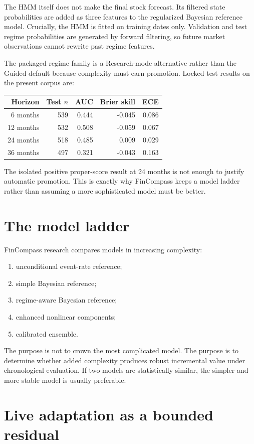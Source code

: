 \documentclass[11pt]{article}
\begin{document}
The HMM itself does not make the final stock forecast. Its filtered state probabilities are added as three features to the regularized Bayesian reference model. Crucially, the HMM is fitted on training dates only. Validation and test regime probabilities are generated by forward filtering, so future market observations cannot rewrite past regime features.

The packaged regime family is a Research-mode alternative rather than the Guided default because complexity must earn promotion. Locked-test results on the present corpus are:
\begin{center}
\begin{tabular}{rrrrr}\toprule
Horizon & Test $n$ & AUC & Brier skill & ECE\\\midrule
6 months & 539 & 0.444 & -0.045 & 0.086\\
12 months & 532 & 0.508 & -0.059 & 0.067\\
24 months & 518 & 0.485 & 0.009 & 0.029\\
36 months & 497 & 0.321 & -0.043 & 0.163\\
\bottomrule\end{tabular}
\end{center}
The isolated positive proper-score result at 24 months is not enough to justify automatic promotion. This is exactly why FinCompass keeps a model ladder rather than assuming a more sophisticated model must be better.

\section{The model ladder}
FinCompass research compares models in increasing complexity:
\begin{enumerate}
\item unconditional event-rate reference;
\item simple Bayesian reference;
\item regime-aware Bayesian reference;
\item enhanced nonlinear components;
\item calibrated ensemble.
\end{enumerate}
The purpose is not to crown the most complicated model. The purpose is to determine whether added complexity produces robust incremental value under chronological evaluation. If two models are statistically similar, the simpler and more stable model is usually preferable.

\section{Live adaptation as a bounded residual}
\end{document}
